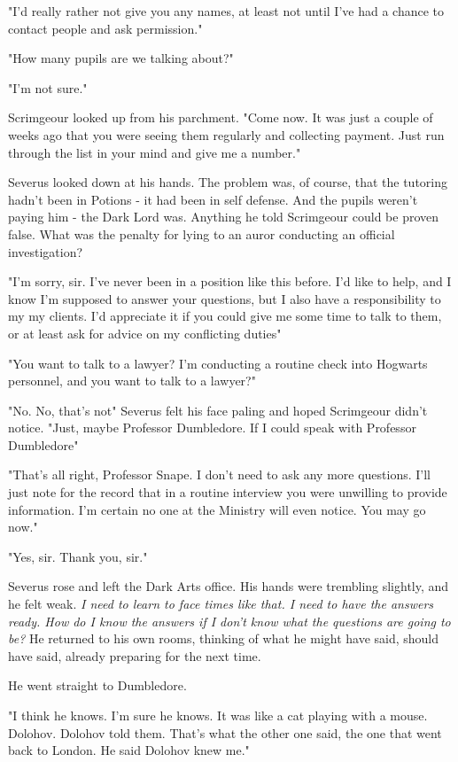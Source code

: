 "I'd really rather not give you any names, at least not until I've had a chance to contact people and ask permission."

"How many pupils are we talking about?"

"I'm not sure."

Scrimgeour looked up from his parchment. "Come now. It was just a couple of weeks ago that you were seeing them regularly and collecting payment. Just run through the list in your mind and give me a number."

Severus looked down at his hands. The problem was, of course, that the tutoring hadn't been in Potions - it had been in self defense. And the pupils weren't paying him - the Dark Lord was. Anything he told Scrimgeour could be proven false. What was the penalty for lying to an auror conducting an official investigation?

"I'm sorry, sir. I've never been in a position like this before. I'd like to help, and I know I'm supposed to answer your questions, but I also have a responsibility to my{\el} my clients. I'd appreciate it if you could give me some time to talk to them, or at least ask for advice on my conflicting duties{\el}"

"You want to talk to a lawyer? I'm conducting a routine check into Hogwarts personnel, and you want to talk to a lawyer?"

"No. No, that's not{\el}" Severus felt his face paling and hoped Scrimgeour didn't notice. "Just, maybe Professor Dumbledore. If I could speak with Professor Dumbledore{\el}"

"That's all right, Professor Snape. I don't need to ask any more questions. I'll just note for the record that in a routine interview you were unwilling to provide information. I'm certain no one at the Ministry will even notice. You may go now."

"Yes, sir. Thank you, sir."

Severus rose and left the Dark Arts office. His hands were trembling slightly, and he felt weak. \emph{I need to learn to face times like that. I need to have the answers ready. How do I know the answers if I don't know what the questions are going to be?} He returned to his own rooms, thinking of what he might have said, should have said, already preparing for the next time.

He went straight to Dumbledore.

"I think he knows. I'm sure he knows. It was like a cat playing with a mouse. Dolohov. Dolohov told them. That's what the other one said, the one that went back to London. He said Dolohov knew me."

